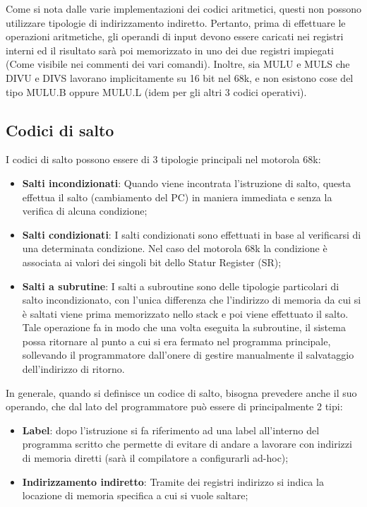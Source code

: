 Come si nota dalle varie implementazioni dei codici aritmetici, questi non possono utilizzare tipologie di indirizzamento indiretto. Pertanto, prima di effettuare le operazioni aritmetiche, gli operandi di input devono essere caricati nei registri interni ed il risultato sarà poi memorizzato in uno dei due registri impiegati (Come visibile nei commenti dei vari comandi).
Inoltre, sia MULU e MULS che DIVU e DIVS lavorano implicitamente su 16 bit nel 68k, e non esistono cose del tipo MULU.B oppure MULU.L (idem per gli altri 3 codici operativi).

\subsection{Codici di salto} \label{par:salto}

I codici di salto possono essere di 3 tipologie principali nel motorola 68k:
\begin{itemize}
    \item \textbf{Salti incondizionati}: Quando viene incontrata l'istruzione di salto, questa effettua il salto (cambiamento del PC) in maniera immediata e senza la verifica di alcuna condizione;

    \item \textbf{Salti condizionati}: I salti condizionati sono effettuati in base al verificarsi di una determinata condizione. Nel caso del motorola 68k la condizione è associata ai valori dei singoli bit dello Statur Register (SR);

    \item \textbf{Salti a subrutine}: I salti a subroutine sono delle tipologie particolari di salto incondizionato, con l'unica differenza che l'indirizzo di memoria da cui si è saltati viene prima memorizzato nello stack e poi viene effettuato il salto. Tale operazione fa in modo che una volta eseguita la subroutine, il sistema possa ritornare al punto a cui si era fermato nel programma principale, sollevando il programmatore dall'onere di gestire manualmente il salvataggio dell'indirizzo di ritorno.
\end{itemize}

In generale, quando si definisce un codice di salto, bisogna prevedere anche il suo operando, che dal lato del programmatore può essere di principalmente 2 tipi:
\begin{itemize}
    \item \textbf{Label}: dopo l'istruzione si fa riferimento ad una label all'interno del programma scritto che permette di evitare di andare a lavorare con indirizzi di memoria diretti (sarà il compilatore a configurarli ad-hoc);

    \item \textbf{Indirizzamento indiretto}: Tramite dei registri indirizzo si indica la locazione di memoria specifica a cui si vuole saltare;
\end{itemize}

